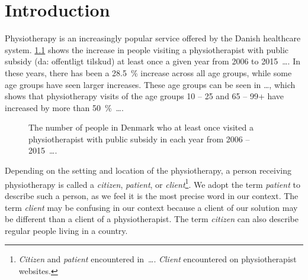 \chapter{Introduction}\label{ch:introduction}

Physiotherapy is an increasingly popular service offered by the Danish healthcare system. \cref{fig:physio-visits} shows the increase in people visiting a physiotherapist with public subsidy (da: offentligt tilskud) at least once a given year from 2006 to 2015~\ldots. In these years, there has been a 28.5~\% increase across all age groups, while some age groups have seen larger increases. These age groups can be seen in \ldots, which shows that physiotherapy visits of the age groups 10 -- 25 and 65 -- 99+ have increased by more than 50~\%~\ldots.


\begin{figure}[htb]%
\centering
{}
\caption[Physiotherapist visits in Denmark]{The number of people in Denmark who at least once visited a physiotherapist with public subsidy in each year from 2006 -- 2015~\ldots.}\label{fig:physio-visits}%
\end{figure}

Depending on the setting and location of the physiotherapy, a person receiving physiotherapy is called a \emph{citizen}, \textit{patient}, or \textit{client}\footnote{\emph{Citizen} and \emph{patient} encountered in~\ldots. \emph{Client} encountered on physiotherapist websites.}. We adopt the term \emph{patient} to describe such a person, as we feel it is the most precise word in our context. The term \emph{client} may be confusing in our context because a client of our solution may be different than a client of a physiotherapist. The term \emph{citizen} can also describe regular people living in a country. 

